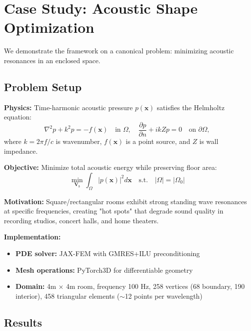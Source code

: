 \documentclass{article}
\begin{document}
\section{Case Study: Acoustic Shape Optimization}

We demonstrate the framework on a canonical problem: minimizing acoustic resonances in an enclosed space.

\subsection{Problem Setup}

\textbf{Physics:} Time-harmonic acoustic pressure $p(\mathbf{x})$ satisfies the Helmholtz equation:
\begin{equation}
    \nabla^2 p + k^2 p = -f(\mathbf{x}) \quad \text{in } \Omega, \quad \frac{\partial p}{\partial n} + ikZp = 0 \quad \text{on } \partial\Omega,
\end{equation}
where $k = 2\pi f/c$ is wavenumber, $f(\mathbf{x})$ is a point source, and $Z$ is wall impedance.

\textbf{Objective:} Minimize total acoustic energy while preserving floor area:
\begin{equation}
    \min_{\mathbf{V}_b} \int_{\Omega} |p(\mathbf{x})|^2 d\mathbf{x} \quad \text{s.t.} \quad |\Omega| = |\Omega_0|
\end{equation}

\textbf{Motivation:} Square/rectangular rooms exhibit strong standing wave resonances at specific frequencies, creating "hot spots" that degrade sound quality in recording studios, concert halls, and home theaters.

\textbf{Implementation:}
\begin{itemize}
    \item \textbf{PDE solver:} JAX-FEM \cite{xue2023jaxfem} with GMRES+ILU preconditioning
    \item \textbf{Mesh operations:} PyTorch3D \cite{ravi2020pytorch3d} for differentiable geometry
    \item \textbf{Domain:} 4m $\times$ 4m room, frequency 100 Hz, 258 vertices (68 boundary, 190 interior), 458 triangular elements ($\sim$12 points per wavelength)
\end{itemize}

\subsection{Results}
\end{document}
